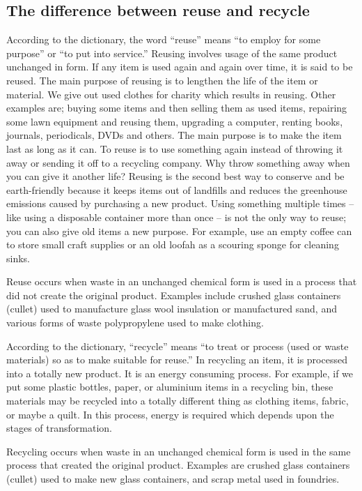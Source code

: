 \subsection{The difference between reuse and recycle}
According to the dictionary, the word “reuse” means “to employ for some purpose” or “to put into service.” Reusing involves usage of the same product unchanged in form. If any item is used again and again over time, it is said to be reused. The main purpose of reusing is to lengthen the life of the item or material. We give out used clothes for charity which results in reusing. Other examples are; buying some items and then selling them as used items, repairing some lawn equipment and reusing them, upgrading a computer, renting books, journals, periodicals, DVDs and others. The main purpose is to make the item last as long as it can. To reuse is to use something again instead of throwing it away or sending it off to a recycling company. Why throw something away when you can give it another life? Reusing is the second best way to conserve and be earth-friendly because it keeps items out of landfills and reduces the greenhouse emissions caused by purchasing a new product. Using something multiple times -- like using a disposable container more than once -- is not the only way to reuse; you can also give old items a new purpose. For example, use an empty coffee can to store small craft supplies or an old loofah as a scouring sponge for cleaning sinks.

Reuse occurs when waste in an unchanged chemical form is used in a process that did not create the original product. Examples include crushed glass containers (cullet) used to manufacture glass wool insulation or manufactured sand, and various forms of waste polypropylene used to make clothing.

According to the dictionary, “recycle” means “to treat or process (used or waste materials) so as to make suitable for reuse.” In recycling an item, it is processed into a totally new product. It is an energy consuming process. For example, if we put some plastic bottles, paper, or aluminium items in a recycling bin, these materials may be recycled into a totally different thing as clothing items, fabric, or maybe a quilt. In this process, energy is required which depends upon the stages of transformation.

Recycling occurs when waste in an unchanged chemical form is used in the same process that created the original product. Examples are crushed glass containers (cullet) used to make new glass containers, and scrap metal used in foundries. 

